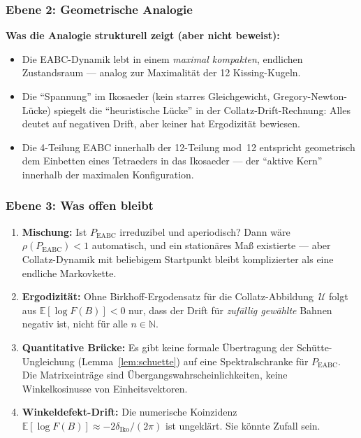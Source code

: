 \documentclass[12pt,a4paper]{article}
\newcommand{\N}{\mathbb{N}}
\newcommand{\E}{\mathbb{E}}
\newcommand{\logF}{\log F(B)}
\begin{document}
\subsubsection{Ebene 2: Geometrische Analogie}

\begin{tcolorbox}[analogie]
\textbf{Was die Analogie strukturell zeigt (aber nicht beweist):}
\begin{itemize}[noitemsep]
  \item Die EABC-Dynamik lebt in einem \emph{maximal kompakten},
        endlichen Zustandsraum --- analog zur Maximalität der 12 Kissing-Kugeln.
  \item Die ``Spannung'' im Ikosaeder (kein starres Gleichgewicht,
        Gregory-Newton-Lücke) spiegelt die ``heuristische Lücke'' in der
        Collatz-Drift-Rechnung: Alles deutet auf negativen Drift, aber
        keiner hat Ergodizität bewiesen.
  \item Die 4-Teilung EABC innerhalb der 12-Teilung mod~12 entspricht
        geometrisch dem Einbetten eines Tetraeders in das Ikosaeder ---
        der ``aktive Kern'' innerhalb der maximalen Konfiguration.
\end{itemize}
\end{tcolorbox}

\subsubsection{Ebene 3: Was offen bleibt}

\begin{tcolorbox}[lücke, title={Fundamental offene Fragen}]
\begin{enumerate}[noitemsep]
  \item \textbf{Mischung:} Ist $P_{\text{EABC}}$ irreduzibel und aperiodisch?
        Dann wäre $\rho(P_{\text{EABC}}) < 1$ automatisch, und ein
        stationäres Maß existierte --- aber Collatz-Dynamik mit beliebigem
        Startpunkt bleibt komplizierter als eine endliche Markovkette.

  \item \textbf{Ergodizität:} Ohne Birkhoff-Ergodensatz für die
        Collatz-Abbildung~$\mathcal{U}$ folgt aus $\E[\logF] < 0$ nur,
        dass der Drift für \emph{zufällig gewählte} Bahnen negativ ist,
        nicht für alle $n \in \N$.

  \item \textbf{Quantitative Brücke:} Es gibt keine formale Übertragung
        der Schütte-Ungleichung (Lemma~\ref{lem:schuette}) auf eine
        Spektralschranke für $P_{\text{EABC}}$.
        Die Matrixeinträge sind Übergangswahrscheinlichkeiten, keine
        Winkelkosinusse von Einheitsvektoren.

  \item \textbf{Winkeldefekt-Drift:} Die numerische Koinzidenz
        $\E[\logF] \approx -2\delta_{\text{Iko}}/(2\pi)$ ist ungeklärt.
        Sie könnte Zufall sein.
\end{enumerate}
\end{tcolorbox}
\end{document}

